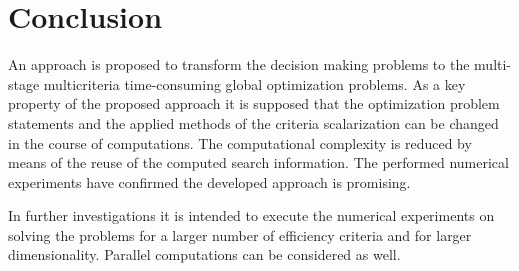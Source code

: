 \documentclass[runningheads]{llncs}
\begin{document}
\section{Conclusion}
An approach is proposed to transform the decision making problems to the multi-stage multicriteria time-consuming global optimization problems. As a key property of the proposed approach it is supposed that the optimization problem statements and the applied methods of the criteria scalarization can be changed in the course of computations. The computational complexity is reduced by means of the reuse of the computed search information. The performed numerical experiments have confirmed the developed approach is promising.

In further investigations it is intended to execute the numerical experiments on solving the problems for a larger number of efficiency criteria and for larger dimensionality. Parallel computations can be considered as well.
\end{document}
